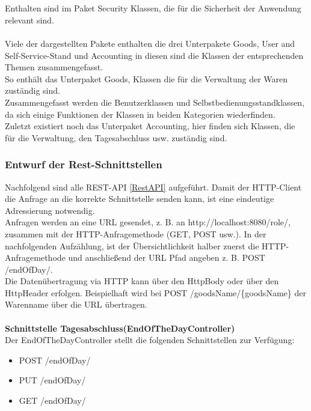 \\
\\
Enthalten sind im Paket Security Klassen, die für die Sicherheit der Anwendung relevant sind.
\\
\\
Viele der dargestellten Pakete enthalten die drei Unterpakete Goods, User and Self-Service-Stand und Accounting in diesen sind die Klassen der entsprechenden Themen zusammengefasst.
\\
So enthält das Unterpaket Goods, Klassen die für die Verwaltung der Waren zuständig sind.
\\
Zusammengefasst werden die Benutzerklassen und Selbstbedienungsstandklassen, da sich einige Funktionen der Klassen in beiden Kategorien wiederfinden. 
\\
Zuletzt existiert noch das Unterpaket Accounting, hier finden sich Klassen, die für die Verwaltung, den Tagesabschluss usw. zuständig sind. 


\subsubsection{Entwurf der Rest-Schnittstellen}\label{entwurf_der_Schnittstellen}

Nachfolgend sind alle REST-API \ref{RestAPI} aufgeführt. Damit der HTTP-Client die Anfrage an die korrekte Schnittstelle senden kann, ist eine eindeutige Adressierung notwendig. 
\\
Anfragen werden an eine URL gesendet, z. B. an http://localhost:8080/role/, zusammen mit der HTTP-Anfragemethode (GET, POST usw.). In der nachfolgenden Aufzählung, ist der Übersichtlichkeit halber zuerst die HTTP-Anfragemethode und anschließend der URL Pfad angeben z. B. POST /endOfDay/.
\\
Die Datenübertragung via HTTP kann über den HttpBody oder über den HttpHeader erfolgen. Beispielhaft wird bei POST /goodsName/\{goodsName\} der Warenname über die URL übertragen.
\\
\\
\textbf{Schnittstelle Tagesabschluss(EndOfTheDayController)}
\\
Der EndOfTheDayController stellt die folgenden Schnittstellen zur Verfügung:
\begin{itemize}
	\itemsep0pt
	\item  POST /endOfDay/
	\item  PUT /endOfDay/
	\item  GET /endOfDay/
\end{itemize}

